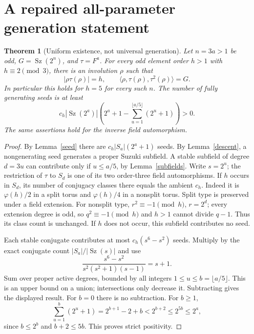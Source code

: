 \documentclass[11pt,a4paper]{article}
\newtheorem{theorem}{Theorem}\newtheorem{lemma}[theorem]{Lemma}\newtheorem{corollary}[theorem]{Corollary}
\newcommand{\Sz}{\operatorname{Sz}}\newcommand{\Aut}{\operatorname{Aut}}\newcommand{\gen}[1]{\langle#1\rangle}
\begin{document}
\section{A repaired all-parameter generation statement}
\begin{theorem}[Uniform existence, not universal generation]\label{uniform}
Let $n=3a>1$ be odd, $G=\Sz(2^n)$, and $\tau=F^a$.
For every odd element order $h>1$ with $h\equiv2\pmod3$, there is an
involution $\rho$ such that
\[
 |\rho\tau(\rho)|=h,\qquad
 \langle\rho,\tau(\rho),\tau^2(\rho)\rangle=G.
\]
In particular this holds for $h=5$ for every such $n$.
The number of fully generating seeds is at least
\[
 c_h |\Sz(2^a)|\left(2^a+1-
 \sum_{u=1}^{\lfloor a/5\rfloor}(2^u+1)\right)>0.
\]
The same assertions hold for the inverse field automorphism.
\end{theorem}
\begin{proof}
By Lemma~\ref{seed} there are $c_h|S_a|(2^a+1)$ seeds. By
Lemma~\ref{descent}, a nongenerating seed generates a proper Suzuki
subfield. A stable subfield of degree $d=3u$ can contribute only if
$u\le a/5$, by Lemma~\ref{subfields}. Write $s=2^u$; the restriction
of $\tau$ to $S_d$ is one of its two order-three field automorphisms.
If $h$ occurs in $S_d$, its number of conjugacy classes there equals the
ambient $c_h$. Indeed it is $\varphi(h)/2$ in a split torus and
$\varphi(h)/4$ in a nonsplit torus. Split type is preserved under a field
extension. For nonsplit type, $r^2\equiv-1\pmod h$, $r=2^d$; every
extension degree is odd, so $q^2\equiv-1\pmod h$ and $h>1$ cannot divide
$q-1$. Thus its class count is unchanged. If $h$ does not occur, this
subfield contributes no seed.

Each stable conjugate contributes at most $c_h(s^6-s^2)$ seeds. Multiply
by the exact conjugate count $|S_a|/|\Sz(s)|$ and use
\[
 \frac{s^6-s^2}{s^2(s^2+1)(s-1)}=s+1.
\]
Sum over proper active degrees, bounded by all integers
$1\le u\le b=\lfloor a/5\rfloor$. This is an upper bound on a union;
intersections only decrease it. Subtracting gives the displayed result.
For $b=0$ there is no subtraction. For $b\ge1$,
\[
 \sum_{u=1}^b(2^u+1)=2^{b+1}-2+b
 <2^{b+2}\le2^{5b}\le2^a,
\]
since $b\le2^b$ and $b+2\le5b$. This proves strict positivity.
\end{proof}
\end{document}
